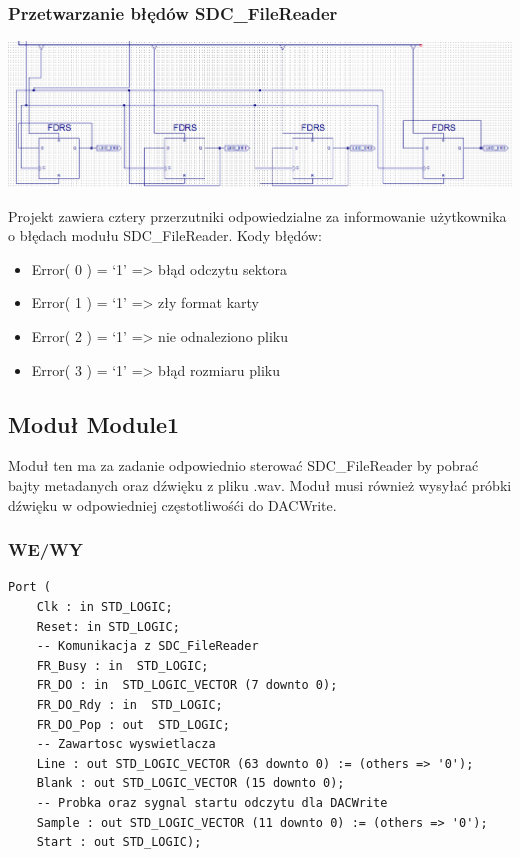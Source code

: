 \documentclass{article}
\begin{document}
\newpage
\subsubsection{Przetwarzanie błędów SDC\_FileReader}
\begin{center}
	\includegraphics[scale=0.5, center]{photo/sch_error.png}
\end{center}
\par Projekt zawiera cztery przerzutniki odpowiedzialne za informowanie użytkownika o błędach modułu SDC\_FileReader. Kody błędów\cite{zsk}: 
\begin{itemize} 
	\item Error( 0 ) = ‘1’ => błąd odczytu sektora
	\item Error( 1 ) = ‘1’ => zły format karty
	\item Error( 2 ) = ‘1’ => nie odnaleziono pliku
	\item Error( 3 ) = ‘1’ => błąd rozmiaru pliku
\end{itemize}

\newpage
\subsection{Moduł Module1}
\par Moduł ten ma za zadanie odpowiednio sterować SDC\_FileReader by pobrać bajty metadanych oraz dźwięku z pliku .wav. Moduł musi również wysyłać próbki dźwięku w odpowiedniej częstotliwośći do DACWrite.
\subsubsection{WE/WY}
\begin{lstlisting}[basicstyle=\small]
Port ( 
	Clk : in STD_LOGIC;
	Reset: in STD_LOGIC;
	-- Komunikacja z SDC_FileReader
	FR_Busy : in  STD_LOGIC;
	FR_DO : in  STD_LOGIC_VECTOR (7 downto 0);
	FR_DO_Rdy : in  STD_LOGIC;
	FR_DO_Pop : out  STD_LOGIC;
	-- Zawartosc wyswietlacza 
	Line : out STD_LOGIC_VECTOR (63 downto 0) := (others => '0');
	Blank : out STD_LOGIC_VECTOR (15 downto 0);
	-- Probka oraz sygnal startu odczytu dla DACWrite
	Sample : out STD_LOGIC_VECTOR (11 downto 0) := (others => '0');
	Start : out STD_LOGIC);
\end{lstlisting}
\end{document}
